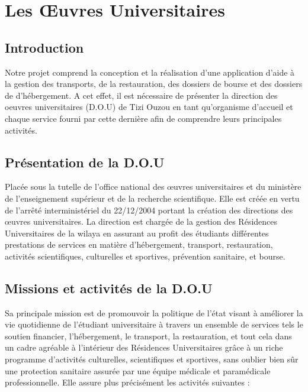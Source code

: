 \chapter{Les Œuvres Universitaires}

\section{Introduction}
    Notre projet comprend la conception et la réalisation d'une application d'aide à la gestion des transports, de la restauration, des dossiers de bourse et des dossiers de d'hébergement. A cet effet, il est nécessaire de présenter la direction des oeuvres universitaires (D.O.U) de Tizi Ouzou en tant qu'organisme d'accueil et chaque service fourni par cette dernière afin de comprendre leurs principales activités.\\

\section{Présentation de la D.O.U}
    Placée sous la tutelle de l’office national des œuvres universitaires et du ministère de l’enseignement supérieur et de la recherche scientifique. Elle est créée en vertu de l’arrêté interministériel du 22/12/2004 portant la création des directions des œuvres universitaires. La direction est chargée de la gestion des Résidences Universitaires de la wilaya en assurant au profit des étudiants différentes prestations de services en matière d’hébergement, transport, restauration, activités scientifiques, culturelles et sportives, prévention sanitaire, et bourse.\\

\section{Missions et activités de la D.O.U}
    Sa principale mission est de promouvoir la politique de l'état visant à améliorer la vie quotidienne de l'étudiant universitaire à travers un ensemble de services tels le soutien financier, l'hébergement, le transport, la restauration, et tout cela dans un cadre agréable à l'intérieur des Résidences Universitaires grâce à un riche programme d'activités culturelles, scientifiques et sportives, sans oublier bien sûr une protection sanitaire assurée par une équipe médicale et paramédicale professionnelle. Elle assure plus précisément les activités suivantes :\\
    
